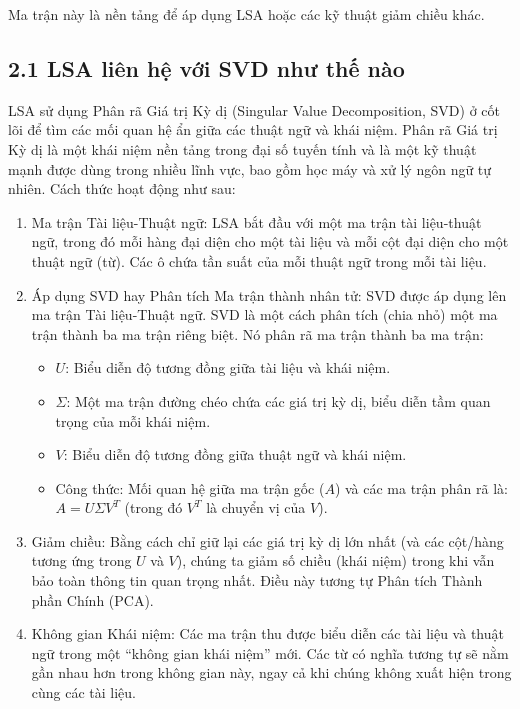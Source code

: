 Ma trận này là nền tảng để áp dụng LSA hoặc các kỹ thuật giảm chiều khác.

\subsection*{2.1 LSA liên hệ với SVD như thế nào}

LSA sử dụng Phân rã Giá trị Kỳ dị (Singular Value Decomposition, SVD) ở cốt lõi để tìm các mối quan hệ ẩn giữa các thuật ngữ và khái niệm. Phân rã Giá trị Kỳ dị là một khái niệm nền tảng trong đại số tuyến tính và là một kỹ thuật mạnh được dùng trong nhiều lĩnh vực, bao gồm học máy và xử lý ngôn ngữ tự nhiên. Cách thức hoạt động như sau:

\begin{enumerate}
  \item Ma trận Tài liệu-Thuật ngữ: LSA bắt đầu với một ma trận tài liệu-thuật ngữ, trong đó mỗi hàng đại diện cho một tài liệu và mỗi cột đại diện cho một thuật ngữ (từ). Các ô chứa tần suất của mỗi thuật ngữ trong mỗi tài liệu.

  \item Áp dụng SVD hay Phân tích Ma trận thành nhân tử: SVD được áp dụng lên ma trận Tài liệu-Thuật ngữ. SVD là một cách phân tích (chia nhỏ) một ma trận thành ba ma trận riêng biệt. Nó phân rã ma trận thành ba ma trận:
  \begin{itemize}
    \item $U$: Biểu diễn độ tương đồng giữa tài liệu và khái niệm.
    \item $\Sigma$: Một ma trận đường chéo chứa các giá trị kỳ dị, biểu diễn tầm quan trọng của mỗi khái niệm.
    \item $V$: Biểu diễn độ tương đồng giữa thuật ngữ và khái niệm.
    \item Công thức: Mối quan hệ giữa ma trận gốc ($A$) và các ma trận phân rã là: $A = U \Sigma V^T$ (trong đó $V^T$ là chuyển vị của $V$).
  \end{itemize}

  \item Giảm chiều: Bằng cách chỉ giữ lại các giá trị kỳ dị lớn nhất (và các cột/hàng tương ứng trong $U$ và $V$), chúng ta giảm số chiều (khái niệm) trong khi vẫn bảo toàn thông tin quan trọng nhất. Điều này tương tự Phân tích Thành phần Chính (PCA).

  \item Không gian Khái niệm: Các ma trận thu được biểu diễn các tài liệu và thuật ngữ trong một ``không gian khái niệm'' mới. Các từ có nghĩa tương tự sẽ nằm gần nhau hơn trong không gian này, ngay cả khi chúng không xuất hiện trong cùng các tài liệu.
\end{enumerate}

